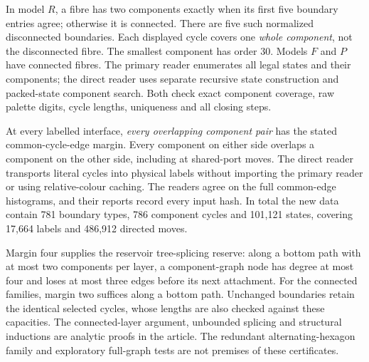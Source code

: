\documentclass[11pt]{article}
\numberwithin{equation}{section}
\numberwithin{table}{section}
\begin{document}
In model $R$, a fibre has two components exactly when its first five
boundary entries agree; otherwise it is connected. There are five such
normalized disconnected boundaries. Each displayed cycle covers one
\emph{whole component}, not the disconnected fibre. The smallest
component has order $30$. Models $F$ and $P$ have connected fibres.
The primary reader enumerates all legal states and their components;
the direct reader uses separate recursive state construction and
packed-state component search. Both check exact component coverage,
raw palette digits, cycle lengths, uniqueness and all closing steps.

At every labelled interface, \emph{every overlapping component pair}
has the stated common-cycle-edge margin. Every component on either
side overlaps a component on the other side, including at shared-port
moves. The direct reader transports literal cycles into physical labels
without importing the primary reader or using relative-colour caching.
The readers agree on the full common-edge histograms, and their reports
record every input hash. In total the new data contain 781 boundary
types, 786 component cycles and 101,121 states, covering 17,664 labels
and 486,912 directed moves.

Margin four supplies the reservoir tree-splicing reserve: along a bottom
path with at most two components per layer, a component-graph node has degree
at most four and loses at most three edges before its next attachment.
For the connected families, margin two suffices along a bottom path.
Unchanged boundaries retain the identical selected cycles, whose lengths
are also checked against these capacities. The connected-layer argument,
unbounded splicing and structural inductions are analytic proofs in the
article. The redundant alternating-hexagon family and exploratory
full-graph tests are not premises of these certificates.
\end{document}
